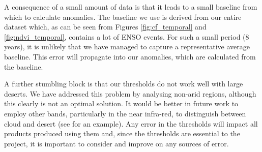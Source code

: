 A consequence of a small amount of data is that it leads to a small
baseline from which to calculate anomalies. The baseline we use is
derived from our entire dataset which, as can be seen from Figures
\ref{fig:cf_temporal} and \ref{fig:ndvi_temporal}, contains a lot of
ENSO events. For such a small period (8 years), it is unlikely that we
have managed to capture a representative average baseline. This error
will propagate into our anomalies, which are calculated from the
baseline.

A further stumbling block is that our thresholds do not work well with
large deserts. We have addressed this problem by analysing non-arid
regions, although this clearly is not an optimal solution. It would be
better in future work to employ other bands, particularly in the near
infra-red, to distinguish between cloud and desert (see
\cite{derrien1993} for an example). Any error in the thresholds will
impact all products produced using them and, since the thresholds are
essential to the project, it is important to consider and improve on
any sources of error.


